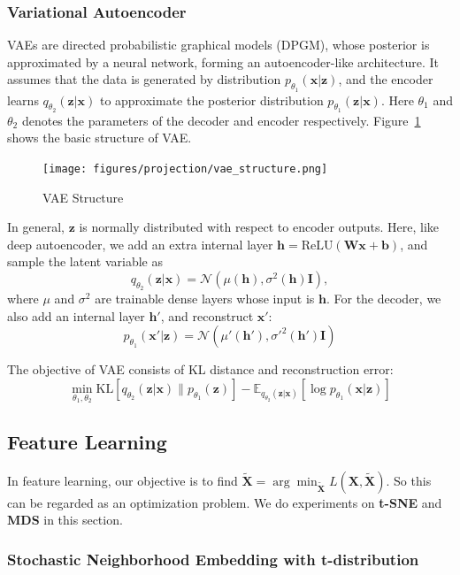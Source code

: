 \documentclass[journal]{IEEEtran}
\begin{document}
\subsubsection{Variational Autoencoder}
VAEs are directed probabilistic graphical models (DPGM), whose posterior is approximated by a neural network, forming an autoencoder-like architecture. It assumes that the data is generated by distribution $p_{\theta_1}(\mathbf x|\mathbf z)$, and the encoder learns $q_{\theta_2}(\mathbf z|\mathbf x)$ to approximate the posterior distribution $p_{\theta_1}(\mathbf z|\mathbf x)$. Here $\theta_1$ and $\theta_2$ denotes the parameters of the decoder and encoder respectively. Figure~\ref{fig:vae} shows the basic structure of VAE.

\begin{figure}
    \centering
    \texttt{[image: figures/projection/vae\_structure.png]}
    \caption{VAE Structure}
    \label{fig:vae}
\end{figure}

In general, $\mathbf z$ is normally distributed with respect to encoder outputs. Here, like deep autoencoder, we add an extra internal layer $\mathbf h = \mathrm{ReLU}(\mathbf {Wx+b})$, and sample the latent variable as
$$
q_{\theta_2}(\mathbf z|\mathbf x) = \mathcal N(\mu(\mathbf h), \sigma^2(\mathbf h)\mathbf I),
$$
where $\mu$ and $\sigma^2$ are trainable dense layers whose input is $\mathbf h$. For the decoder, we also add an internal layer $\mathbf h'$, and reconstruct $\mathbf x'$:
$$
p_{\theta_1}(\mathbf x'|\mathbf z) = \mathcal N(\mu'(\mathbf h'), {\sigma'}^2(\mathbf h')\mathbf I)
$$

The objective of VAE consists of KL distance and reconstruction error:
$$
\min_{\theta_1,\theta_2} \mathrm{KL}[q_{\theta_2}(\mathbf z|\mathbf x) \| p_{\theta_1}(\mathbf z)] - \mathbb E_{q_{\theta_2}(\mathbf z|\mathbf x)}[\log p_{\theta_1}(\mathbf x|\mathbf z)]
$$

\subsection{Feature Learning}
In feature learning, our objective is to find $\mathbf{\tilde{X}} = \arg\min_{\mathbf{\tilde{X}}} L(\mathbf{X,\tilde{X}})$. So this can be regarded as an optimization problem. We do experiments on \textbf{t-SNE} and \textbf{MDS} in this section.
\subsubsection{Stochastic Neighborhood Embedding with t-distribution}
\end{document}
